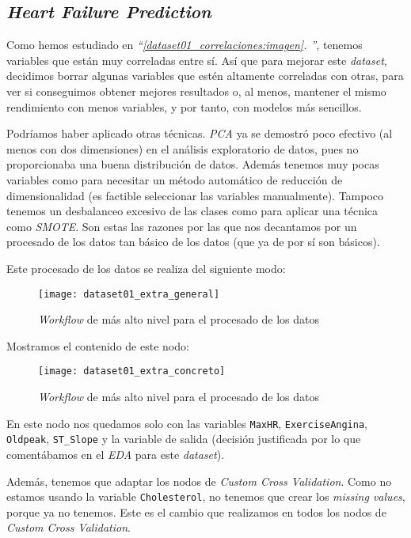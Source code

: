 \documentclass[11pt]{article}
\newcommand{\customcite}[1]{\emph{``\ref{#1}. \nameref{#1}''}}
\begin{document}
\subsection{\emph{Heart Failure Prediction}} \label{dataset01_procesado_datos:seccion}

Como hemos estudiado en \customcite{dataset01_correlaciones:imagen}, tenemos variables que están muy correladas entre sí. Así que para mejorar este \emph{dataset}, decidimos borrar algunas variables que estén altamente correladas con otras, para ver si conseguimos obtener mejores resultados o, al menos, mantener el mismo rendimiento con menos variables, y por tanto, con modelos más sencillos.

Podríamos haber aplicado otras técnicas. \emph{PCA} ya se demostró poco efectivo (al menos con dos dimensiones) en el análisis exploratorio de datos, pues no proporcionaba una buena distribución de datos. Además tenemos muy pocas variables como para necesitar un método automático de reducción de dimensionalidad (es factible seleccionar las variables manualmente). Tampoco tenemos un desbalanceo excesivo de las clases como para aplicar una técnica como \emph{SMOTE}. Son estas las razones por las que nos decantamos por un procesado de los datos tan básico de los datos (que ya de por sí son básicos).

Este procesado de los datos se realiza del siguiente modo:

\begin{figure}[H]
    \centering
    \texttt{[image: dataset01\_extra\_general]}
    \caption{\emph{Workflow} de más alto nivel para el procesado de los datos}
\end{figure}

Mostramos el contenido de este nodo:

\begin{figure}[H]
    \centering
    \texttt{[image: dataset01\_extra\_concreto]}
    \caption{\emph{Workflow} de más alto nivel para el procesado de los datos}
\end{figure}

En este nodo nos quedamos solo con las variables \lstinline{MaxHR}, \lstinline{ExerciseAngina}, \lstinline{Oldpeak}, \lstinline{ST_Slope} y la variable de salida (decisión justificada por lo que comentábamos en el \emph{EDA} para este \emph{dataset}).

Además, tenemos que adaptar los nodos de \emph{Custom Cross Validation}. Como no estamos usando la variable \lstinline{Cholesterol}, no tenemos que crear los \emph{missing values}, porque ya no tenemos. Este es el cambio que realizamos en todos los nodos de \emph{Custom Cross Validation}.
\end{document}
